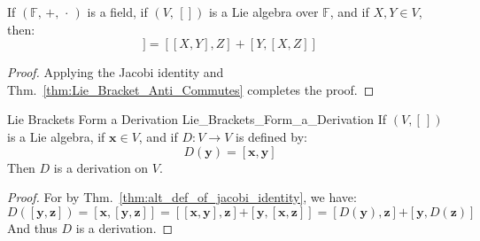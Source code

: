     \begin{theorem}
        \label{thm:alt_def_of_jacobi_identity}
        If $(\mathbb{F},\,+,\,\cdot\,)$ is a field, if $(V,\,[])$ is a
        Lie algebra over $\mathbb{F}$, and if $X,Y\in{V}$, then:
        \begin{equation}
            [X,[Y,Z]]=[[X,Y],Z]+[Y,[X,Z]]
        \end{equation}
    \end{theorem}
    \begin{proof}
        Applying the Jacobi identity and
        Thm.~\ref{thm:Lie_Bracket_Anti_Commutes} completes the proof.
    \end{proof}
    \begin{ltheorem}{Lie Brackets Form a Derivation}
                    {Lie_Brackets_Form_a_Derivation}
        If $(V,[\,])$ is a Lie algebra, if $\mathbf{x}\in{V}$, and if
        $D:V\rightarrow{V}$ is defined by:
        \begin{equation}
            D(\mathbf{y})=[\mathbf{x},\mathbf{y}]
        \end{equation}
        Then $D$ is a derivation on $V$.
    \end{ltheorem}
    \begin{proof}
        For by Thm.~\ref{thm:alt_def_of_jacobi_identity}, we have:
        \begin{equation}
            D([\mathbf{y},\mathbf{z}])=
            [\mathbf{x},[\mathbf{y},\mathbf{z}]]=
            [[\mathbf{x},\mathbf{y}],\mathbf{z}]\boldsymbol{+}
            [\mathbf{y},[\mathbf{x},\mathbf{z}]]=
            [D(\mathbf{y}),\mathbf{z}]\boldsymbol{+}
            [\mathbf{y},D(\mathbf{z})]
        \end{equation}
        And thus $D$ is a derivation.
    \end{proof}
